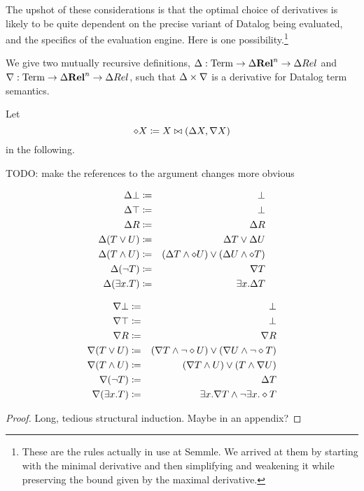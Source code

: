 The upshot of these considerations is that the optimal choice of derivatives is likely
to be quite dependent on the precise variant of Datalog being evaluated, and the
specifics of the evaluation engine. Here is one possibility.\footnote{These are
  the rules actually in use at Semmle. We arrived at them by starting with the
  minimal derivative and then simplifying and weakening it while preserving the
  bound given by the maximal derivative.}

\newcommand{\bothdiff}{\diamond}
\begin{thm}
\label{thm:concreteDatalog}
  We give two mutually recursive definitions,
  $\Delta: \mathrm{Term} \rightarrow \Delta \mathbf{Rel}^n \rightarrow \Delta Rel$ and
  $\nabla: \mathrm{Term} \rightarrow \Delta \mathbf{Rel}^n \rightarrow \Delta Rel$, such
  that $\Delta \times \nabla$ is a derivative for Datalog term semantics.
  
  Let $$\diamond X \coloneqq X \bowtie (\Delta X, \nabla X)$$ in the following.

  TODO: make the references to the argument changes more obvious
  
  \begin{eqnarray*}
  \updiff\bot & \defeq & \bot\\
  \updiff\top & \defeq & \bot\\
  \updiff R & \defeq & \updiff R\\
  \updiff(T\vee U) & \defeq & \updiff T \vee \updiff U\\
  \updiff(T\wedge U) & \defeq & (\updiff T\wedge \bothdiff U) 
                           \vee 
                           (\updiff U \wedge \bothdiff T)\\
  \updiff(\neg T) & \defeq & \downdiff T\\
  \updiff(\exists x.T) & \defeq & \exists x.\updiff T
  \end{eqnarray*}

  \begin{eqnarray*}
  \downdiff\bot & \defeq & \bot\\
  \downdiff\top & \defeq & \bot\\
  \downdiff R & \defeq & \downdiff R\\
  \downdiff(T\vee U) & \defeq & (\downdiff T \wedge \neg \bothdiff U) 
                           \vee 
                           (\downdiff U \wedge \neg \bothdiff T)\\
  \downdiff(T\wedge U) & \defeq & (\downdiff T\wedge U) \vee (T \wedge \downdiff U)\\
  \downdiff(\neg T) & \defeq & \updiff T\\
  \downdiff(\exists x.T) & \defeq & \exists x.\downdiff T \wedge \neg \exists x.\bothdiff T
  \end{eqnarray*}
\end{thm}
\begin{proof}
  Long, tedious structural induction. Maybe in an appendix?
\end{proof}

